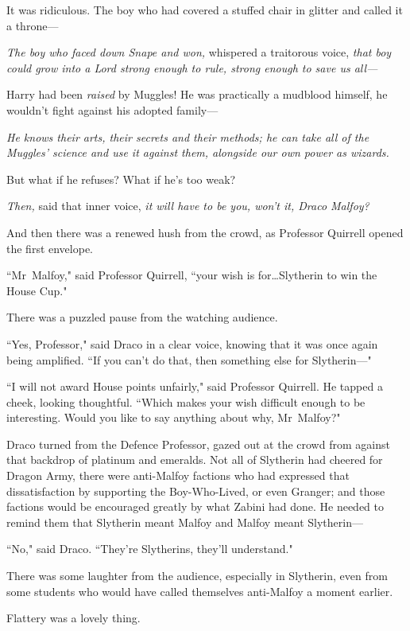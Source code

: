 It was ridiculous. The boy who had covered a stuffed chair in glitter and called it a throne—

\emph{The boy who faced down Snape and won,} whispered a traitorous voice, \emph{that boy could grow into a Lord strong enough to rule, strong enough to save us all—}

Harry had been \emph{raised} by Muggles! He was practically a mudblood himself, he wouldn't fight against his adopted family—

\emph{He knows their arts, their secrets and their methods; he can take all of the Muggles' science and use it against them, alongside our own power as wizards.}

But what if he refuses? What if he's too weak?

\emph{Then,} said that inner voice, \emph{it will have to be you, won't it, Draco Malfoy?}

And then there was a renewed hush from the crowd, as Professor Quirrell opened the first envelope.

``Mr~Malfoy," said Professor Quirrell, ``your wish is for…Slytherin to win the House Cup."

There was a puzzled pause from the watching audience.

``Yes, Professor," said Draco in a clear voice, knowing that it was once again being amplified. ``If you can't do that, then something else for Slytherin—"

``I will not award House points unfairly," said Professor Quirrell. He tapped a cheek, looking thoughtful. ``Which makes your wish difficult enough to be interesting. Would you like to say anything about why, Mr~Malfoy?"

Draco turned from the Defence Professor, gazed out at the crowd from against that backdrop of platinum and emeralds. Not all of Slytherin had cheered for Dragon Army, there were anti-Malfoy factions who had expressed that dissatisfaction by supporting the Boy-Who-Lived, or even Granger; and those factions would be encouraged greatly by what Zabini had done. He needed to remind them that Slytherin meant Malfoy and Malfoy meant Slytherin—

``No," said Draco. ``They're Slytherins, they'll understand."

There was some laughter from the audience, especially in Slytherin, even from some students who would have called themselves anti-Malfoy a moment earlier.

Flattery was a lovely thing.

